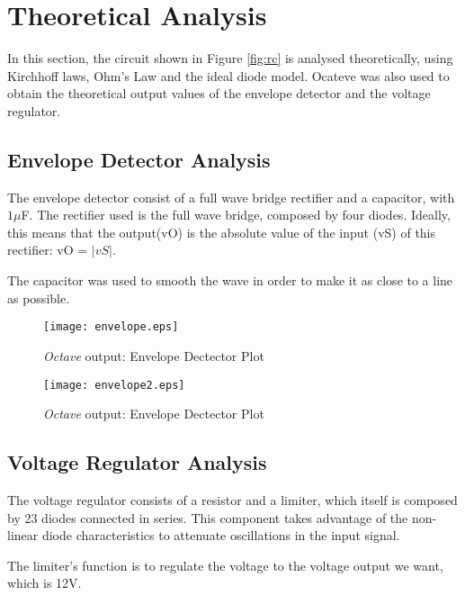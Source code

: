 \section{Theoretical Analysis} \label{sec:analysis}

In this section, the circuit shown in Figure \ref{fig:rc} is analysed theoretically, using Kirchhoff laws, Ohm's Law and the ideal diode model.
Ocateve was also used to obtain the theoretical output values of the envelope detector and the voltage regulator. 



\subsection{Envelope Detector Analysis}

The envelope detector consist of a full wave bridge rectifier and a capacitor, with $1\mu$F.
The rectifier used is the full wave bridge, composed by four diodes. Ideally, this means that the output(vO) is the absolute value of the input (vS) of this rectifier: vO = $|vS|$.

The capacitor was used to smooth the wave in order to make it as close to a line as possible.



\begin{figure}[h]
    \centering
    \texttt{[image: envelope.eps]}
    \caption{{\it Octave} output: Envelope Dectector Plot}
    \label{fig:OctaveOut}
\end{figure}

\begin{figure}[h]
    \centering
    \texttt{[image: envelope2.eps]}
    \caption{{\it Octave} output: Envelope Dectector Plot}
    \label{fig:OctaveOut}
\end{figure}



\subsection{Voltage Regulator Analysis}

The voltage regulator consists of a resistor and a limiter, which itself is composed by 23 diodes connected in series. This component takes advantage of the non-linear diode characteristics to attenuate oscillations in the input signal.

The limiter’s function is to regulate the voltage to the voltage output we want, which is 12V.

